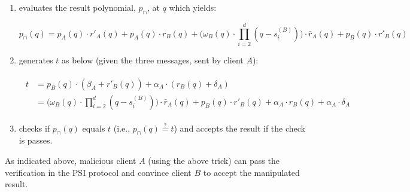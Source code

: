    \begin{enumerate}
 \item evaluates the result polynomial, $p_{\scriptscriptstyle \cap}$, at $q$ which yields: 
   
   
 $$p_{\scriptscriptstyle \cap}(q)=p_{\scriptscriptstyle A}(q) \cdot r'_{\scriptscriptstyle A}(q)+p_{\scriptscriptstyle A}(q)\cdot r_{\scriptscriptstyle B}(q)+{\Big(\omega_{\scriptscriptstyle B}(q)\cdot \prod\limits^{\scriptscriptstyle d}_{\scriptscriptstyle i=2}(q-s^{\scriptscriptstyle(B)}_{\scriptscriptstyle i})\Big)}\cdot \bar{r}_{\scriptscriptstyle A}(q)+p_{\scriptscriptstyle B}(q)\cdot r'_{\scriptscriptstyle B}(q)$$
 
   \item generates $t$ as below (given the three messages, sent by client $A$):
   


\begin{align*}
\begin{split}
t&=p_{\scriptscriptstyle B}(q)\cdot(\beta_{\scriptscriptstyle A}+r'_{\scriptscriptstyle B}(q))+\alpha_{\scriptscriptstyle A}\cdot(r_{\scriptscriptstyle B}(q)+\delta_{\scriptscriptstyle A})\\
   &=    \Big(\omega_{\scriptscriptstyle B}(q)\cdot \prod\limits^{\scriptscriptstyle d}_{\scriptscriptstyle i=2}(q-s^{\scriptscriptstyle(B)}_{\scriptscriptstyle i})\Big) \cdot \bar{r}_{\scriptscriptstyle A}(q)+ p_{\scriptscriptstyle B}(q)\cdot r'_{\scriptscriptstyle B}(q)+\alpha_{\scriptscriptstyle A}\cdot r_{\scriptscriptstyle B}(q)+ \alpha_{\scriptscriptstyle A}\cdot \delta_{\scriptscriptstyle A}
\end{split}
\end{align*}   
   \item checks if $p_{\scriptscriptstyle \cap}(q)$ equals  $t$ (i.e., $p_{\scriptscriptstyle \cap}(q)\stackrel{\scriptscriptstyle ?}=t$) and accepts the result if the check is passes. 
   \end{enumerate}
   
   As indicated above,  malicious client $A$ (using the above trick) can pass the verification in the PSI protocol and convince client $B$ to accept the manipulated result. 
   
   
   
   \
   
